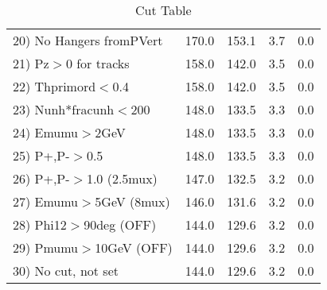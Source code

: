 \begin{table}[h!]
\begin{tabular}{||l||r|r|r|r||}
 20) No Hangers fromPVert &       170.0 &       153.1 &         3.7 &         0.0 \\
 21) Pz$>$0 for tracks    &       158.0 &       142.0 &         3.5 &         0.0 \\
 22) Thprimord$<$0.4      &       158.0 &       142.0 &         3.5 &         0.0 \\
 23) Nunh*fracunh$<$200   &       148.0 &       133.5 &         3.3 &         0.0 \\
 24) Emumu$>$2GeV         &       148.0 &       133.5 &         3.3 &         0.0 \\
 25) P+,P-$>$0.5          &       148.0 &       133.5 &         3.3 &         0.0 \\
 26) P+,P-$>$1.0 (2.5mux) &       147.0 &       132.5 &         3.2 &         0.0 \\
 27) Emumu$>$5GeV  (8mux) &       146.0 &       131.6 &         3.2 &         0.0 \\
 28) Phi12$>$90deg  (OFF) &       144.0 &       129.6 &         3.2 &         0.0 \\
 29) Pmumu$>$10GeV  (OFF) &       144.0 &       129.6 &         3.2 &         0.0 \\
 30) No cut, not set      &       144.0 &       129.6 &         3.2 &         0.0 \\
 \hline
 \hline
 \end{tabular}
 \caption{Cut Table \cohpip }
 \label{tab-cut_copip}
 \end{table}
